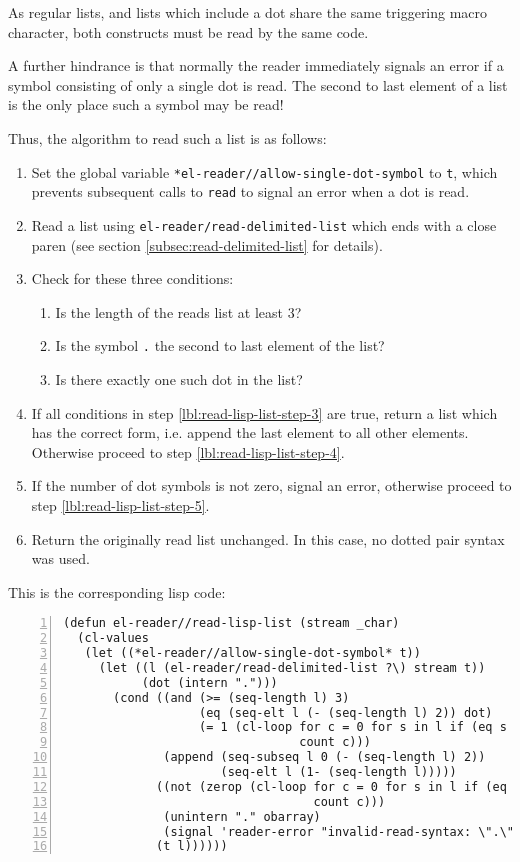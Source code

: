 \documentclass[a4paper,10pt,twoside]{report}
\newcommand{\sym}[1]{\texttt{#1}}
\newcommand{\fun}[1]{\texttt{#1}}
\newcommand{\Read}{\fun{read}}
\begin{document}
As regular lists, and lists which include a dot share the same triggering macro
character, both constructs must be read by the same code.

A further hindrance is that normally the reader immediately signals an error if
a symbol consisting of only a single dot is read.  The second to last element of
a list is the only place such a symbol may be read!

Thus, the algorithm to read such a list is as follows:

\begin{enumerate}
\item Set the global variable \sym{*el-reader//allow-single-dot-symbol} to
  \sym{t}, which prevents subsequent calls to \Read{} to signal an error when
  a dot is read.
\item Read a list using \fun{el-reader/read-delimited-list} which ends with a
  close paren (see section \ref{subsec:read-delimited-list} for details).
\item \label{lbl:read-lisp-list-step-3}
  Check for these three conditions:
  \begin{enumerate}
  \item Is the length of the reads list at least 3?
  \item Is the symbol \sym{.} the second to last element of the list?
  \item Is there exactly one such dot in the list?
  \end{enumerate}
\item If all conditions in step \ref{lbl:read-lisp-list-step-3} are true, return
  a list which has the correct form, i.e. append the last element to all other
  elements.  Otherwise proceed to step \ref{lbl:read-lisp-list-step-4}.
\item \label{lbl:read-lisp-list-step-4}
  If the number of dot symbols is not zero, signal an error, otherwise proceed
  to step \ref{lbl:read-lisp-list-step-5}.
\item \label{lbl:read-lisp-list-step-5}
  Return the originally read list unchanged.  In this case, no dotted pair
  syntax was used.
\end{enumerate}

This is the corresponding lisp code:
\begin{lstlisting}[style=lispcode,label={code:read-lisp-list},caption={Code for
    \fun{el-reader//read-lisp-list}},numbers=left]
(defun el-reader//read-lisp-list (stream _char)
  (cl-values
   (let ((*el-reader//allow-single-dot-symbol* t))
     (let ((l (el-reader/read-delimited-list ?\) stream t))
           (dot (intern ".")))
       (cond ((and (>= (seq-length l) 3)
                   (eq (seq-elt l (- (seq-length l) 2)) dot)
                   (= 1 (cl-loop for c = 0 for s in l if (eq s dot)
                                 count c)))
              (append (seq-subseq l 0 (- (seq-length l) 2))
                      (seq-elt l (1- (seq-length l)))))
             ((not (zerop (cl-loop for c = 0 for s in l if (eq s dot)
                                   count c)))
              (unintern "." obarray)
              (signal 'reader-error "invalid-read-syntax: \".\""))
             (t l))))))
\end{lstlisting}
\end{document}
